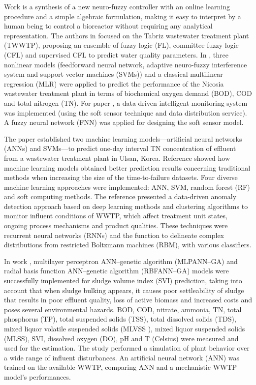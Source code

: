 Work \cite{Haggege2005} is a synthesis of a new neuro-fuzzy controller with an online learning procedure and a simple algebraic formulation, making it easy to interpret by a human being to control a bioreactor without requiring any analytical representation. The authors in \cite{Nadiri2018} focused on the Tabriz wastewater treatment plant (TWWTP), proposing an ensemble of fuzzy logic (FL), committee fuzzy logic (CFL)  and supervised CFL to predict water quality parameters. In \cite{Nourani2018}, three nonlinear models (feedforward neural network, adaptive neuro-fuzzy interference system and support vector machines (SVMs)) and a classical multilinear regression (MLR) were applied to predict the performance of the Nicosia wastewater treatment plant in terms of biochemical oxygen demand (BOD), COD and total nitrogen (TN). For paper \cite{Han2018}, a data-driven intelligent monitoring system was implemented (using the soft sensor technique and data distribution service). A fuzzy neural network (FNN) was applied for designing the soft sensor model.

The paper \cite{Guo2015} established two machine learning models—artificial neural networks (ANNs) and SVMs—to predict one-day interval TN concentration of effluent from a wastewater treatment plant in Ulsan, Korea. Reference \cite{Alsina2018} showed how machine learning models obtained better prediction results concerning traditional methods when increasing the size of the time-to-failure datasets. Four diverse machine learning approaches were implemented: ANN, SVM, random forest (RF) and soft computing methods. The reference \cite{Dairi2019} presented a data-driven anomaly detection approach based on deep learning methods and clustering algorithms to monitor influent conditions of WWTP, which affect treatment unit states, ongoing process mechanisms and product qualities. These techniques were recurrent neural networks (RNNs) and the function to delineate complex distributions from restricted Boltzmann machines (RBM), with various classifiers.

In work \cite{Bagheri2015}, multilayer perceptron ANN–genetic algorithm (MLPANN–GA) and radial basis function ANN–genetic algorithm (RBFANN–GA) models were successfully implemented for sludge volume index (SVI) prediction, taking into account that when sludge bulking appears, it causes poor settleability of sludge that results in poor effluent quality, loss of active biomass and increased costs and poses several environmental hazards. BOD, COD, nitrate, ammonia, TN, total phosphorus (TP), total suspended solids (TSS), total dissolved solids (TDS), mixed liquor volatile suspended solids (MLVSS ), mixed liquor suspended solids (MLSS), SVI, dissolved oxygen (DO), pH and T (Celsius) were measured and used for the estimation. The study \cite{Raduly2007} performed a simulation of plant behavior over a wide range of influent disturbances. An artificial neural network (ANN) was trained on the available WWTP, comparing ANN and a mechanistic WWTP model’s performances.

